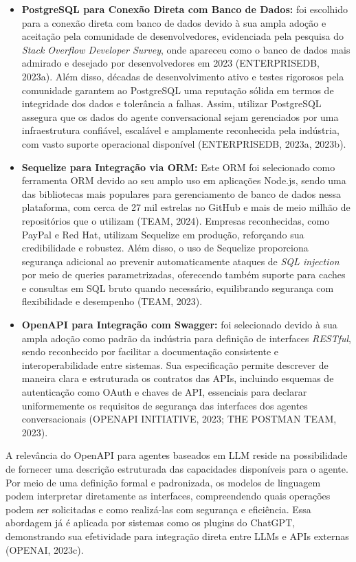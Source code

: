 \documentclass[
]{article}
\begin{document}
\begin{itemize}
\item
  \textbf{PostgreSQL para Conexão Direta com Banco de Dados:} foi
  escolhido para a conexão direta com banco de dados devido à sua ampla
  adoção e aceitação pela comunidade de desenvolvedores, evidenciada
  pela pesquisa do \emph{Stack Overflow Developer Survey}, onde apareceu
  como o banco de dados mais admirado e desejado por desenvolvedores em
  2023 (ENTERPRISEDB, 2023a). Além disso, décadas de desenvolvimento
  ativo e testes rigorosos pela comunidade garantem ao PostgreSQL uma
  reputação sólida em termos de integridade dos dados e tolerância a
  falhas. Assim, utilizar PostgreSQL assegura que os dados do agente
  conversacional sejam gerenciados por uma infraestrutura confiável,
  escalável e amplamente reconhecida pela indústria, com vasto suporte
  operacional disponível (ENTERPRISEDB, 2023a, 2023b).
\item
  \textbf{Sequelize para Integração via ORM:} Este ORM foi selecionado
  como ferramenta ORM devido ao seu amplo uso em aplicações Node.js,
  sendo uma das bibliotecas mais populares para gerenciamento de banco
  de dados nessa plataforma, com cerca de 27 mil estrelas no GitHub e
  mais de meio milhão de repositórios que o utilizam (TEAM, 2024).
  Empresas reconhecidas, como PayPal e Red Hat, utilizam Sequelize em
  produção, reforçando sua credibilidade e robustez. Além disso, o uso
  de Sequelize proporciona segurança adicional ao prevenir
  automaticamente ataques de \emph{SQL injection} por meio de queries
  parametrizadas, oferecendo também suporte para caches e consultas em
  SQL bruto quando necessário, equilibrando segurança com flexibilidade
  e desempenho (TEAM, 2023).
\item
  \textbf{OpenAPI para Integração com Swagger:} foi selecionado devido à
  sua ampla adoção como padrão da indústria para definição de interfaces
  \emph{RESTful}, sendo reconhecido por facilitar a documentação
  consistente e interoperabilidade entre sistemas. Sua especificação
  permite descrever de maneira clara e estruturada os contratos das
  APIs, incluindo esquemas de autenticação como OAuth e chaves de API,
  essenciais para declarar uniformemente os requisitos de segurança das
  interfaces dos agentes conversacionais (OPENAPI INITIATIVE, 2023; THE
  POSTMAN TEAM, 2023).
\end{itemize}

A relevância do OpenAPI para agentes baseados em LLM reside na
possibilidade de fornecer uma descrição estruturada das capacidades
disponíveis para o agente. Por meio de uma definição formal e
padronizada, os modelos de linguagem podem interpretar diretamente as
interfaces, compreendendo quais operações podem ser solicitadas e como
realizá-las com segurança e eficiência. Essa abordagem já é aplicada por
sistemas como os plugins do ChatGPT, demonstrando sua efetividade para
integração direta entre LLMs e APIs externas (OPENAI, 2023c).
\end{document}
